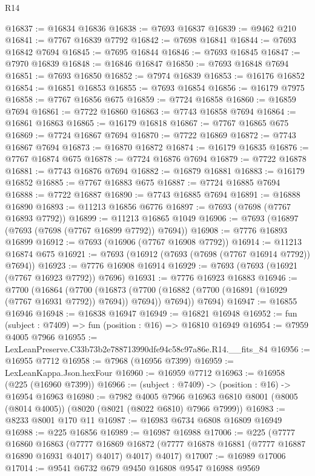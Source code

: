 \begin{lexlean}{R14}
\begin{coremodule}
@16837 := @16834 @16836
@16838 := @7693 @16837
@16839 := @9462 @210
@16841 := @7767 @16839 @7792
@16842 := @7698 @16841
@16844 := @7693 @16842 @7694
@16845 := @7695 @16844
@16846 := @7693 @16845
@16847 := @7970 @16839
@16848 := @16846 @16847
@16850 := @7693 @16848 @7694
@16851 := @7693 @16850
@16852 := @7974 @16839
@16853 := @16176 @16852
@16854 := @16851 @16853
@16855 := @7693 @16854
@16856 := @16179 @7975
@16858 := @7767 @16856 @675
@16859 := @7724 @16858
@16860 := @16859 @7694
@16861 := @7722 @16860
@16863 := @7743 @16858 @7694
@16864 := @16861 @16863
@16865 := @16179 @16818
@16867 := @7767 @16865 @675
@16869 := @7724 @16867 @7694
@16870 := @7722 @16869
@16872 := @7743 @16867 @7694
@16873 := @16870 @16872
@16874 := @16179 @16835
@16876 := @7767 @16874 @675
@16878 := @7724 @16876 @7694
@16879 := @7722 @16878
@16881 := @7743 @16876 @7694
@16882 := @16879 @16881
@16883 := @16179 @16852
@16885 := @7767 @16883 @675
@16887 := @7724 @16885 @7694
@16888 := @7722 @16887
@16890 := @7743 @16885 @7694
@16891 := @16888 @16890
@16893 := @11213 @16856 @6776
@16897 := @7693 (@7698 (@7767 @16893 @7792))
@16899 := @11213 @16865 @1049
@16906 := @7693 (@16897 (@7693 (@7698 (@7767 @16899 @7792)) @7694))
@16908 := @7776 @16893 @16899
@16912 := @7693 (@16906 (@7767 @16908 @7792))
@16914 := @11213 @16874 @675
@16921 := @7693 (@16912 (@7693 (@7698 (@7767 @16914 @7792)) @7694))
@16923 := @7776 @16908 @16914
@16929 := @7693 (@7693 (@16921 (@7767 @16923 @7792)) @7696)
@16931 := @7776 @16923 @16883
@16946 := @7700
    (@16864
      (@7700
        (@16873 (@7700 (@16882 (@7700 (@16891 (@16929 (@7767 @16931 @7792)) @7694)) @7694)) @7694))
      @7694)
@16947 := @16855 @16946
@16948 := @16838 @16947
@16949 := @16821 @16948
@16952 := fun (subject : @7409) => fun (position : @16) => @16810 @16949
@16954 := @7959 @4005 @7966
@16955 := LexLeanPreserve.C33b73b2e788713990dfe94c58c97a86e.R14.__fits_84
@16956 := @16955 @7712
@16958 := @7968 (@16956 @7399)
@16959 := LexLeanKappa.Json.hexFour
@16960 := @16959 @7712
@16963 := @16958 (@225 (@16960 @7399))
@16966 := (subject : @7409) -> (position : @16) -> @16954 @16963
@16980 := @7982
    @4005
    @7966
    @16963
    @6810
    @8001
    (@8005 (@8014 @4005))
    (@8020 (@8021 (@8022 @6810) @7966 @7999))
@16983 := @8233 @8001 @170 @11
@16987 := @16983 @6734 @6808 @16809 @16949
@16988 := @225 @16856
@16989 := @16987 @16988
@17006 := @225
    (@7777
      @16860
      @16863
      (@7777 @16869 @16872 (@7777 @16878 @16881 (@7777 @16887 @16890 @16931 @4017) @4017) @4017)
      @4017)
@17007 := @16989 @17006
@17014 := @9541 @6732 @679 @9450 @16808 @9547 @16988 @9569

\end{coremodule}
\end{lexlean}
